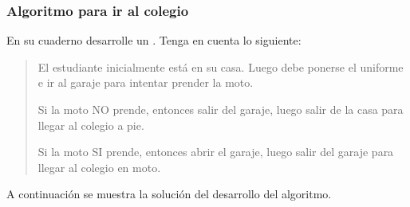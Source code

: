 \documentclass[letterpaper,10pt,spanish]{sphinxmanual}
\begin{document}
\subsubsection*{Algoritmo para ir al colegio}

\sphinxAtStartPar
En su cuaderno desarrolle un . Tenga en cuenta lo siguiente:
\begin{quote}

\sphinxAtStartPar
El estudiante inicialmente está en su casa. Luego debe ponerse el uniforme e ir al garaje para intentar prender la moto.

\sphinxAtStartPar
Si la moto NO prende, entonces salir del garaje, luego salir de la casa para llegar al colegio a pie.

\sphinxAtStartPar
Si la moto SI prende, entonces abrir el garaje, luego salir del garaje para llegar al colegio en moto.
\end{quote}

\sphinxAtStartPar
A continuación se muestra la solución del desarrollo del algoritmo.
\end{document}
